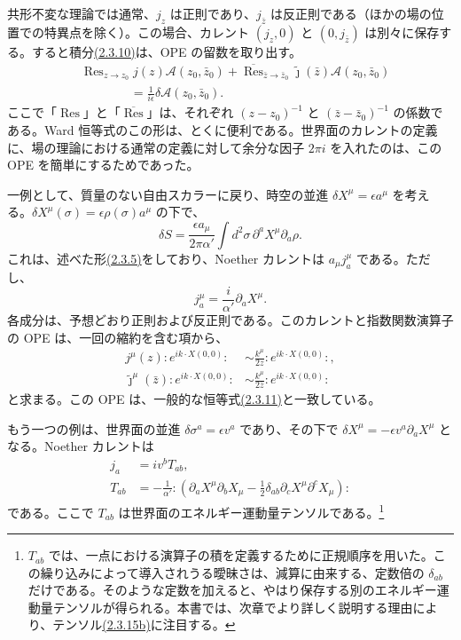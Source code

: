 共形不変な理論では通常、$j_z$ は正則であり、$j_{\bar z}$ は反正則である（ほかの場の位置での特異点を除く）。この場合、カレント $(j_z,0)$ と $(0,j_{\bar z})$ は別々に保存する。すると積分\hyperref[eq:2.3.10]{(2.3.10)}は、OPE の留数を取り出す。
\begin{equation}
\begin{aligned}
&\operatorname{Res}_{z\to z_0}j(z)\mathcal A(z_0,\bar z_0)
+\overline{\operatorname{Res}}_{\bar z\to\bar z_0}
\tilde{\jmath}(\bar z)\mathcal A(z_0,\bar z_0)\\
&\hspace{4em}=\frac{1}{i\epsilon}\delta\mathcal A(z_0,\bar z_0).
\end{aligned}
\tag{2.3.11}\label{eq:2.3.11}
\end{equation}
ここで「$\operatorname{Res}$」と「$\overline{\operatorname{Res}}$」は、それぞれ $(z-z_0)^{-1}$ と $(\bar z-\bar z_0)^{-1}$ の係数である。Ward 恒等式のこの形は、とくに便利である。世界面のカレントの定義に、場の理論における通常の定義に対して余分な因子 $2\pi i$ を入れたのは、この OPE を簡単にするためであった。

一例として、質量のない自由スカラーに戻り、時空の並進 $\delta X^\mu=\epsilon a^\mu$ を考える。$\delta X^\mu(\sigma)=\epsilon\rho(\sigma)a^\mu$ の下で、
\begin{equation}
\delta S=\frac{\epsilon a_\mu}{2\pi\alpha'}
\int d^2\sigma\,\partial^aX^\mu\partial_a\rho.
\tag{2.3.12}\label{eq:2.3.12}
\end{equation}
これは、述べた形\hyperref[eq:2.3.5]{(2.3.5)}をしており、Noether カレントは $a_\mu j_a^\mu$ である。ただし、
\begin{equation}
j_a^\mu=\frac{i}{\alpha'}\partial_aX^\mu.
\tag{2.3.13}\label{eq:2.3.13}
\end{equation}
各成分は、予想どおり正則および反正則である。このカレントと指数関数演算子の OPE は、一回の縮約を含む項から、
\begin{align}
j^\mu(z):e^{ik\cdot X(0,0)}:
&\sim\frac{k^\mu}{2z}:e^{ik\cdot X(0,0)}:,
\tag{2.3.14a}\label{eq:2.3.14a}\\
\tilde{\jmath}^\mu(\bar z):e^{ik\cdot X(0,0)}:
&\sim\frac{k^\mu}{2\bar z}:e^{ik\cdot X(0,0)}:
\tag{2.3.14b}\label{eq:2.3.14b}
\end{align}
と求まる。この OPE は、一般的な恒等式\hyperref[eq:2.3.11]{(2.3.11)}と一致している。

もう一つの例は、世界面の並進 $\delta\sigma^a=\epsilon v^a$ であり、その下で $\delta X^\mu=-\epsilon v^a\partial_aX^\mu$ となる。Noether カレントは
\begin{align}
j_a&=iv^bT_{ab},
\tag{2.3.15a}\label{eq:2.3.15a}\\
T_{ab}&=-\frac{1}{\alpha'}:
\left(\partial_aX^\mu\partial_bX_\mu
-\frac12\delta_{ab}\partial_cX^\mu\partial^cX_\mu\right):
\tag{2.3.15b}\label{eq:2.3.15b}
\end{align}
である。ここで $T_{ab}$ は世界面のエネルギー運動量テンソルである。\footnote[2]{$T_{ab}$ では、一点における演算子の積を定義するために正規順序を用いた。この繰り込みによって導入されうる曖昧さは、減算に由来する、定数倍の $\delta_{ab}$ だけである。そのような定数を加えると、やはり保存する別のエネルギー運動量テンソルが得られる。本書では、次章でより詳しく説明する理由により、テンソル\hyperref[eq:2.3.15b]{(2.3.15b)}に注目する。}

